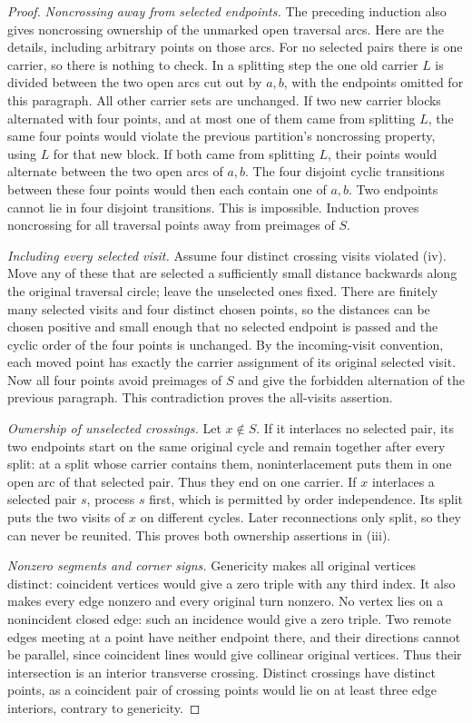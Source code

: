 \begin{proof}
\emph{Noncrossing away from selected endpoints.}
The preceding induction also gives noncrossing ownership of the
unmarked open traversal arcs. Here are the details, including arbitrary
points on those arcs. For no selected pairs there is one carrier, so
there is nothing to check. In a splitting step the one old carrier
$L$ is divided between the two open arcs cut out by $a,b$, with the
endpoints omitted for this paragraph. All other carrier sets are
unchanged. If two new carrier blocks alternated with four points,
and at most one of them came from splitting $L$, the same four points
would violate the previous partition's noncrossing property, using
$L$ for that new block. If both came from splitting $L$, their points
would alternate between the two open arcs of $a,b$. The four disjoint
cyclic transitions between these four points would then each contain
one of $a,b$. Two endpoints cannot lie in four disjoint transitions.
This is impossible. Induction proves noncrossing for all traversal
points away from preimages of $S$.

\emph{Including every selected visit.}
Assume four distinct crossing visits violated (iv). Move any of these
that are selected a sufficiently small distance backwards along the
original traversal circle; leave the unselected ones fixed. There are
finitely many selected visits and four distinct chosen points, so the
distances can be chosen positive and small enough that no selected
endpoint is passed and the cyclic order of the four points is unchanged.
By the incoming-visit convention, each moved point has exactly the
carrier assignment of its original selected visit. Now all four points
avoid preimages of $S$ and give the forbidden alternation of the
previous paragraph. This contradiction proves the all-visits assertion.

\emph{Ownership of unselected crossings.}
Let $x\notin S$. If it interlaces no selected pair, its two endpoints
start on the same original cycle and remain together after every split:
at a split whose carrier contains them, noninterlacement puts them in
one open arc of that selected pair. Thus they end on one carrier.
If $x$ interlaces a selected pair $s$, process $s$ first, which is
permitted by order independence. Its split puts the two visits of $x$
on different cycles. Later reconnections only split, so they can never
be reunited. This proves both ownership assertions in (iii).

\emph{Nonzero segments and corner signs.}
Genericity makes all original vertices distinct: coincident vertices
would give a zero triple with any third index. It also makes every
edge nonzero and every original turn nonzero. No vertex lies on a
nonincident closed edge: such an incidence would give a zero triple.
Two remote edges meeting at a point have neither endpoint there, and
their directions cannot be parallel, since coincident lines would
give collinear original vertices. Thus their intersection is an
interior transverse crossing. Distinct crossings have distinct points,
as a coincident pair of crossing points would lie on at least three
edge interiors, contrary to genericity.


\end{proof}
